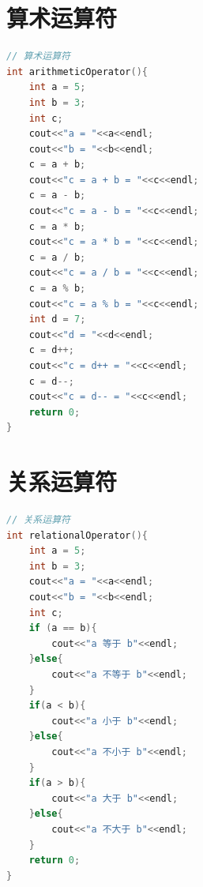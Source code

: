 \documentclass[12pt,twiside,a4paper]{ctexbook}
\numberwithin{chapter}{part}
\begin{document}
\section{算术运算符}
\begin{lstlisting}[language=C++]
// 算术运算符
int arithmeticOperator(){
	int a = 5;
	int b = 3;
	int c;
	cout<<"a = "<<a<<endl;
	cout<<"b = "<<b<<endl;
	c = a + b;
	cout<<"c = a + b = "<<c<<endl;
	c = a - b;
	cout<<"c = a - b = "<<c<<endl;
	c = a * b;
	cout<<"c = a * b = "<<c<<endl;
	c = a / b;
	cout<<"c = a / b = "<<c<<endl;
	c = a % b;
	cout<<"c = a % b = "<<c<<endl;
	int d = 7;
	cout<<"d = "<<d<<endl;
	c = d++;
	cout<<"c = d++ = "<<c<<endl;
	c = d--;
	cout<<"c = d-- = "<<c<<endl;
	return 0;
}
\end{lstlisting}

\section{关系运算符}
\begin{lstlisting}[language=C++]
// 关系运算符
int relationalOperator(){
	int a = 5;
	int b = 3;
	cout<<"a = "<<a<<endl;
	cout<<"b = "<<b<<endl;
	int c;
	if (a == b){
		cout<<"a 等于 b"<<endl;
	}else{
		cout<<"a 不等于 b"<<endl;
	}
	if(a < b){
		cout<<"a 小于 b"<<endl;
	}else{
		cout<<"a 不小于 b"<<endl;
	}
	if(a > b){
		cout<<"a 大于 b"<<endl;
	}else{
		cout<<"a 不大于 b"<<endl;
	}
	return 0;
}
\end{lstlisting}
\end{document}
